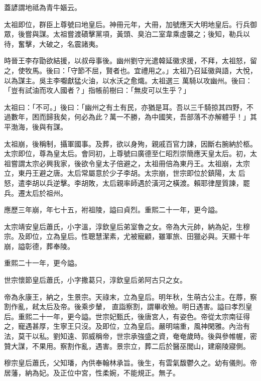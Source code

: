 \begin{pinyinscope}
 蓋諺謂地祗為青牛嫗云。



 太祖即位，群臣上尊號曰地皇后。神冊元年，大冊，加號應天大明地皇后。行兵御眾，後嘗與謀。太祖嘗渡磧擊黨項，黃頭、臭泊二室韋乘虛襲之；後知，勒兵以待，奮擊，大破之，名震諸夷。



 時晉王李存勖欲結援，以叔母事後。幽州劉守光遣韓延徽求援，不拜，太祖怒，留之，使牧馬。後曰：「守節不屈，賢者也。宜禮用之。」太祖乃召延徽與語，大悅，以為謀主。吳主李嚈獻猛火油，以水沃之愈熾。太祖選三
 萬騎以攻幽州。後曰：「豈有試油而攻人國者？」指帳前樹曰：「無皮可以生乎？」



 太祖曰：「不可。」後曰：「幽州之有土有民，亦猶是耳。吾以三千騎掠其四野，不過數年，困而歸我矣，何必為此？萬一不勝，為中國笑，吾部落不亦解體乎！」其平渤海，後與有謀。



 太祖崩，後稱制，攝軍國事。及葬，欲以身殉，親戚百官力諫，因斷右腕納於柩。太宗即位，尊為皇太后。會同初，上尊號曰廣德至仁昭烈崇簡應天皇太后。初，太祖嘗謂太宗必興我家，後欲令皇太子倍避之，太祖冊倍為東丹王。太祖崩，太宗立，東丹王避之唐。太后常屬意於少子李胡。太宗崩，世宗即位於鎮陽，太
 后怒，遣李胡以兵逆擊。李胡敗，太后親率師遇於潢河之橫渡。賴耶律屋質諫，罷兵。遷太后於祖州。



 應歷三年崩，年七十五，袝祖陵，謚曰貞烈。重熙二十一年，更今謚。



 太宗靖安皇后蕭氏，小字溫，淳欽皇后弟室魯之女。帝為大元帥，納為妃，生穆宗。及即位，立為皇后。性聰慧潔素，尤被寵顧，雖軍旅、田獵必與。天顯十年崩，謚彰德，葬奉陵。



 重熙二十一年，更今謚。



 世宗懷節皇后蕭氏，小字撒葛只，淳欽皇后弟阿古只之女。



 帝為永康王，納之，生景宗。天祿末，立為皇后。明年秋，生萌古公主。在蓐，察割作亂，弒太后及帝。後乘步輦，
 直詣察割，謂畢收殮。明日遇害。謚曰孝烈皇后。重熙二十一年，更今謚。世宗妃甄氏，後唐宮人，有姿色。帝從太宗南征得之，寵遇甚厚，生寧王只沒。及即位，立為皇后。嚴明端重，風神閑雅。內治有法，莫干以私。劉知遠、郭威稱帝，世宗承強盛之資，奄奄歲時。後與參帷幄，密贊大謀，不果用。察割作亂，遇害。景宗立，葬二后於醫巫閭山，建廟陵寢側。



 穆宗皇后蕭氏，父知璠，內供奉翰林承旨。後生，有雲氣馥鬱久之。幼有儀則。帝居藩，納為妃。及正位中宮，性柔婉，不能規正。無子。




\end{pinyinscope}
